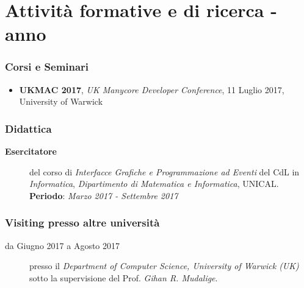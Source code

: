 \part{Attività formative e di ricerca -   anno}

\section{Corsi e Seminari}
\begin{itemize}
	\item \textbf{UKMAC 2017}, \textit{UK Manycore Developer Conference}, 11 Luglio 2017, University of Warwick
\end{itemize}

\section{Didattica}
\begin{description}
\item [\textbf{Esercitatore}] del corso di\textit{ Interfacce Grafiche e Programmazione ad Eventi} del CdL in \textit{Informatica}, \textit{Dipartimento di Matematica e Informatica}, UNICAL. \textbf{Periodo}: \textit{Marzo 2017 - Settembre 2017}
\end{description}

\section{Visiting presso altre università}
\begin{description}
	\item [da Giugno 2017 a Agosto 2017] presso il \textit{Department of Computer Science, University of Warwick (UK)} sotto la supervisione del Prof. \textit{Gihan R. Mudalige}.
\end{description}


